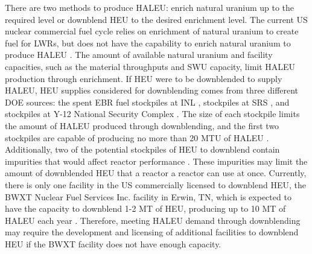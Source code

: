 There are two methods to produce \gls{HALEU}: enrich natural uranium up to 
the required level
or downblend \acrfull{HEU} to the desired enrichment level. The current US
nuclear commercial fuel cycle relies on enrichment of natural uranium 
to create fuel for \glspl{LWR}, but does not have the capability to enrich
natural uranium to produce \gls{HALEU} \cite{nuclear_energy_institute_addressing_2018}.  
The amount of available natural uranium and facility capacities, such 
as the material throughputs and \acrfull{SWU} capacity, limit 
\gls{HALEU} production through enrichment. If \gls{HEU} were to be 
downblended to supply \gls{HALEU}, \gls{HEU} supplies
considered for downblending comes from three different 
\gls{DOE} sources: the spent \gls{EBR} fuel stockpiles at \gls{INL} 
\cite{patterson_haleu_2019}, stockpiles at \gls{SRS} \cite{regalbuto_addressing_2020}, 
and stockpiles at Y-12 National Security Complex 
\cite{robinson_establishment_2020}. The size of each stockpile limits the amount 
of \gls{HALEU} produced through downblending, and the first two stockpiles 
are capable of producing no more than 20 MTU of \gls{HALEU}
\cite{regalbuto_addressing_2020}.
Additionally, two of the potential stockpiles of \gls{HEU} to downblend  
contain impurities that would affect reactor performance 
\cite{vaden_isotopic_2018,nelson_foreign_2010}.
These impurities may limit the amount of downblended \gls{HEU} that a reactor 
a reactor can use at once. 
Currently, there is only one facility in the US commercially licensed to 
downblend \gls{HEU}, the BWXT Nuclear Fuel Services Inc. facility in 
Erwin, TN, which is expected to have the capacity to downblend 1-2 
MT of \gls{HEU}, producing up to 10 MT of \gls{HALEU} each year \cite{nagley_ha-leu_2020}.
Therefore, meeting \gls{HALEU} demand through downblending may require the 
development and licensing of additional facilities to downblend \gls{HEU} if 
the BWXT facility does not have enough capacity. 

